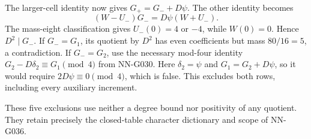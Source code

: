The larger-cell identity now gives $G_+=G_-+D\psi$.
The other identity becomes
\[
             (W-U_-)G_-=D\psi(W+U_-).
\]
The mass-eight classification gives $U_-(0)=4$ or $-4$,
while $W(0)=0$. Hence $D^2\mid G_-$.
If $G_-=G_1$, its quotient by $D^2$ has even coefficients
but mass $80/16=5$, a contradiction.
If $G_-=G_2$, use the necessary mod-four identity
$G_2-D\delta_2\equiv G_1\pmod4$ from NN-G030.
Here $\delta_2=\psi$ and $G_1=G_2+D\psi$, so it would
require $2D\psi\equiv0\pmod4$, which is false.
This excludes both rows, including every auxiliary increment.

These five exclusions use neither a degree bound nor
positivity of any quotient. They retain precisely the
closed-table character dictionary and scope of NN-G036.
